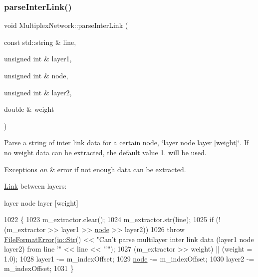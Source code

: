 \subsubsection{\texorpdfstring{parse\+Inter\+Link()}{parseInterLink()}}
{\footnotesize\ttfamily void Multiplex\+Network\+::parse\+Inter\+Link (\begin{DoxyParamCaption}\item[{const std\+::string \&}]{line,  }\item[{unsigned int \&}]{layer1,  }\item[{unsigned int \&}]{node,  }\item[{unsigned int \&}]{layer2,  }\item[{double \&}]{weight }\end{DoxyParamCaption})\hspace{0.3cm}{\ttfamily [protected]}}

Parse a string of inter link data for a certain node, \char`\"{}layer node layer \mbox{[}weight\mbox{]}\char`\"{}. If no weight data can be extracted, the default value 1. will be used. 
\begin{DoxyExceptions}{Exceptions}
{\em an} & error if not enough data can be extracted.\\
\hline
\end{DoxyExceptions}
\mbox{\hyperlink{structLink}{Link}} between layers\+:

layer node layer \mbox{[}weight\mbox{]} 
\begin{DoxyCode}
1022 \{
1023     m\_extractor.clear();
1024     m\_extractor.str(line);
1025     \textcolor{keywordflow}{if} (!(m\_extractor >> layer1 >> \mbox{\hyperlink{structnode}{node}} >> layer2))
1026         \textcolor{keywordflow}{throw} \mbox{\hyperlink{classFileFormatError}{FileFormatError}}(\mbox{\hyperlink{classio_1_1Str}{io::Str}}() << \textcolor{stringliteral}{"Can't parse multilayer inter link data
       (layer1 node layer2) from line '"} << line << \textcolor{stringliteral}{"'"});
1027     (m\_extractor >> weight) || (weight = 1.0);
1028     layer1 -= m\_indexOffset;
1029     \mbox{\hyperlink{structnode}{node}} -= m\_indexOffset;
1030     layer2 -= m\_indexOffset;
1031 \}
\end{DoxyCode}
\mbox{\label{classMultiplexNetwork_abf35346b12fdce91821440d0d49e39fc}} 
